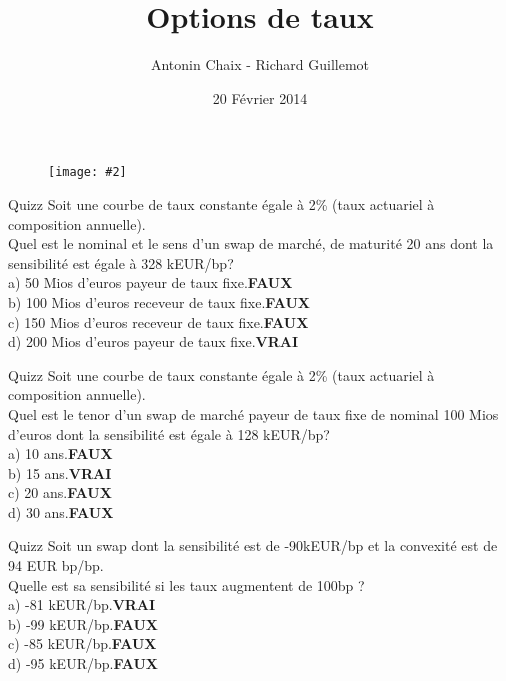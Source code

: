 \documentclass{beamer}
\title[Produits dérivés de taux]{Options de taux}
\author{Antonin Chaix - Richard Guillemot}
\institute{Master IFMA}
\date{20 Février 2014}
\newcommand{\FIG}[2]{\texttt{[image: \#2]}}
\begin{document}
\begin{frame}
\titlepage
\begin{figure}[h]
\centering \FIG{5cm}{figures/UPMC_IFMA.jpg}
\end{figure}

\end{frame}

\begin{frame}{Quizz}
Soit une courbe de taux constante égale à 2\% (taux actuariel à composition annuelle).\\
\vspace{0.5cm}
Quel est le nominal et le sens d'un swap de marché, de maturité 20 ans dont la sensibilité est égale à 328 kEUR/bp?\\
\vspace{0.5cm}
a) 50 Mios d'euros payeur de taux fixe.\textbf{\color{red}FAUX}\\
b) 100 Mios d'euros receveur de taux fixe.\textbf{\color{red}FAUX}\\
c) 150 Mios d'euros receveur de taux fixe.\textbf{\color{red}FAUX}\\
d) 200 Mios d'euros payeur de taux fixe.\textbf{\color{green}VRAI}\\
\end{frame}


\begin{frame}{Quizz}
Soit une courbe de taux constante égale à 2\% (taux actuariel à composition annuelle).\\
\vspace{0.5cm}
Quel est le tenor d'un swap de marché payeur de taux fixe de nominal 100 Mios d'euros dont la sensibilité est égale à 128 kEUR/bp?\\
\vspace{0.5cm}
a) 10 ans.\textbf{\color{red}FAUX}\\
b) 15 ans.\textbf{\color{green}VRAI}\\
c) 20 ans.\textbf{\color{red}FAUX}\\
d) 30 ans.\textbf{\color{red}FAUX}\\
\end{frame}

\begin{frame}{Quizz}
Soit un swap dont la sensibilité est de -90kEUR/bp et la convexité est de 94 EUR bp/bp.\\
\vspace{0.5cm}
Quelle est sa sensibilité si les taux augmentent de 100bp ?\\
a) -81 kEUR/bp.\textbf{\color{green}VRAI}\\
b) -99 kEUR/bp.\textbf{\color{red}FAUX}\\
c) -85 kEUR/bp.\textbf{\color{red}FAUX}\\
d) -95 kEUR/bp.\textbf{\color{red}FAUX}\\
\end{frame}
\end{document}
